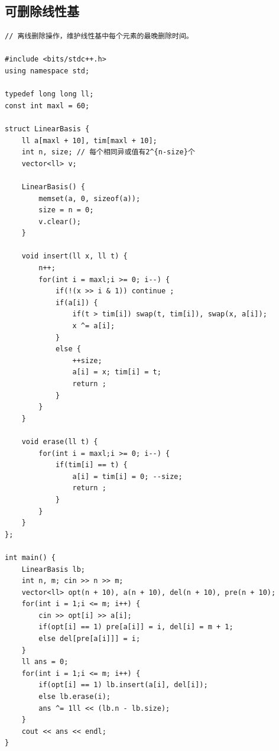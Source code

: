\documentclass[twoside]{article}
\begin{document}
\subsection{可删除线性基}
\begin{lstlisting}
// 离线删除操作，维护线性基中每个元素的最晚删除时间。

#include <bits/stdc++.h>
using namespace std;

typedef long long ll;
const int maxl = 60;

struct LinearBasis {
    ll a[maxl + 10], tim[maxl + 10]; 
    int n, size; // 每个相同异或值有2^{n-size}个
    vector<ll> v;

    LinearBasis() {
        memset(a, 0, sizeof(a));
        size = n = 0;
        v.clear();
    }

    void insert(ll x, ll t) {
        n++;
        for(int i = maxl;i >= 0; i--) {
            if(!(x >> i & 1)) continue ;
            if(a[i]) {
                if(t > tim[i]) swap(t, tim[i]), swap(x, a[i]);
                x ^= a[i];
            }
            else {
                ++size;
                a[i] = x; tim[i] = t;
                return ;
            }
        }
    }

    void erase(ll t) {
        for(int i = maxl;i >= 0; i--) {
            if(tim[i] == t) {
                a[i] = tim[i] = 0; --size;
                return ;
            }
        }
    }
};

int main() {
    LinearBasis lb;
    int n, m; cin >> n >> m;
    vector<ll> opt(n + 10), a(n + 10), del(n + 10), pre(n + 10);
    for(int i = 1;i <= m; i++) {
        cin >> opt[i] >> a[i];
        if(opt[i] == 1) pre[a[i]] = i, del[i] = m + 1;
        else del[pre[a[i]]] = i;
    }
    ll ans = 0;
    for(int i = 1;i <= m; i++) {
        if(opt[i] == 1) lb.insert(a[i], del[i]);
        else lb.erase(i);
        ans ^= 1ll << (lb.n - lb.size);
    }
    cout << ans << endl;
}\end{lstlisting}
\end{document}
